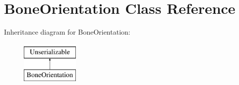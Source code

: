 \hypertarget{class_bone_orientation}{\section{\-Bone\-Orientation \-Class \-Reference}
\label{class_bone_orientation}
}
\-Inheritance diagram for \-Bone\-Orientation\-:\begin{figure}[H]
\begin{center}
\leavevmode
\includegraphics[height=2.000000cm]{class_bone_orientation}
\end{center}
\end{figure}
